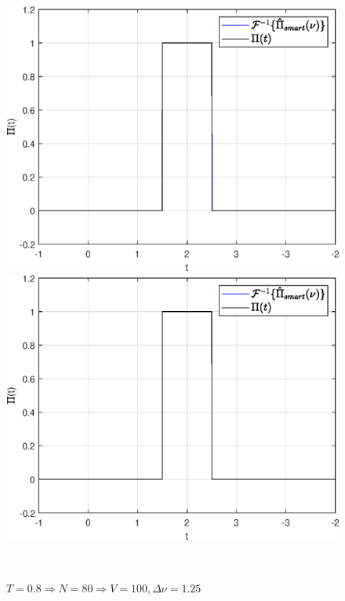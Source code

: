 \documentclass[a4paper]{article}
\begin{document}
\begin{figure}[H]
    \begin{minipage}{0.5\textwidth}
        \centering \includegraphics[width=\textwidth]{graphs/3/T_1.5_dt_0.010067_V_100_dv_0.66667/func_inversed_smart.eps}
        \caption{$T = 1.5 \Rightarrow N = 150 \Rightarrow V = 100, \Delta \nu = \frac{2}{3}$}
    \end{minipage}\hfill
    \begin{minipage}{0.5\textwidth}
        \centering \includegraphics[width=\textwidth]{graphs/3/T_0.8_dt_0.010127_V_100_dv_1.25/func_inversed_smart.eps}
        \caption{$T = 0.8 \Rightarrow N = 80 \Rightarrow V = 100, \Delta \nu = 1.25$}
    \end{minipage}\\[1em]
\end{figure}\noindent\
\end{document}
